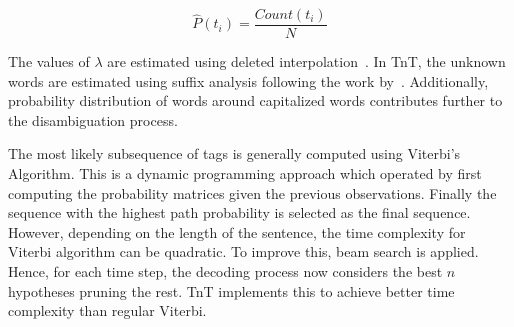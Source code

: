 \begin{equation}
    \hat{P}(t_i) = \frac{Count(t_i)}{N}
\end{equation}



The values of $\lambda$ are estimated using deleted interpolation~\citep{jelinek1980interpolated}. 
In TnT, the unknown words are estimated using suffix analysis following the work by~\cite{W93-0420}. Additionally, probability distribution of words around capitalized words contributes further to the disambiguation process.~ 

The most likely subsequence of tags is generally computed using Viterbi's Algorithm. This is a dynamic programming approach which operated by first computing the probability matrices given the previous observations. Finally the sequence with the highest path probability is selected as the final sequence.~ 
However, depending on the length of the sentence, the time complexity for Viterbi algorithm can be quadratic. To improve this, beam search is applied. Hence, for each time step, the decoding process now considers the best $n$ hypotheses pruning the rest. TnT implements this to achieve better time complexity than regular Viterbi. 












